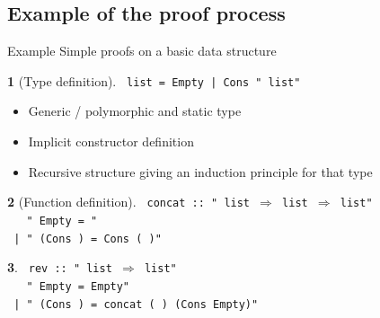 \documentclass{beamer}
\newcommand{\datatype}{{\color{isa_blue}{datatype}}}
\newcommand{\fun}{{\color{isa_blue}{fun}}}
\newcommand{\where}{{\color{isa_green}{where}}}
\newcommand{\generic}[1]{{\color{isa_purple}{\textquotesingle#1}}}
\newcommand{\isa}[1]{\texttt{#1}}
\newcommand{\blue}[1]{{\color{isa_dark_blue}{#1}}}
\newcommand{\green}[1]{{\color{isa_dark_green}{#1}}}
\theoremstyle{definition}
\newtheorem*{isabelle}{}
\begin{document}
\subsection[Example proof]{Example of the proof process}

\begin{frame}
  \centering
  Example
  \vfill
  Simple proofs on a basic data structure
\end{frame}

\begin{frame}
  \begin{isabelle}[Type definition]
    \isa{
      \datatype{} \generic{a} list = Empty | Cons \generic{a} "\generic{a} list"
    }
  \end{isabelle}
  \begin{itemize}
    \item Generic / polymorphic and static type
    \item Implicit constructor definition
    \item Recursive structure giving an induction principle for that type
  \end{itemize}
\end{frame}

\begin{frame}
  \begin{isabelle}[Function definition]
    \isa{
      \fun{} concat :: "\generic{a} list $\Rightarrow$ \generic{a} list $\Rightarrow$ \generic{a} list" \where\\
      ~~~"\blue{concat} Empty \green{xs} = \green{xs}"\\
      ~| "\blue{concat} (Cons \green{x xs}) \green{ys} = Cons \green{x} (\blue{concat} \green{xs ys})"
    }
  \end{isabelle}
  \begin{isabelle}
    \isa{
      \fun{} rev :: "\generic{a} list $\Rightarrow$ \generic{a} list" \where\\
      ~~~"\blue{rev} Empty = Empty"\\
      ~| "\blue{rev} (Cons \green{x xs}) = concat (\blue{rev} \green{xs}) (Cons \green{x} Empty)"
    }
  \end{isabelle}
\end{frame}
\end{document}
